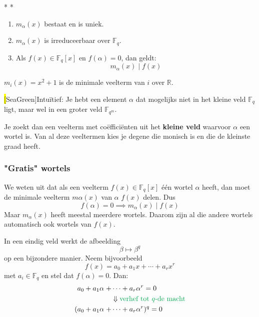 \begin{niceproperty}*\label{eigenshap:l9_min-veelterm}
    \nextpart[]*
    \begin{enumerate}
        \item $m_\alpha(x)$ bestaat en is uniek.
        \item $m_\alpha(x)$ is irreduceerbaar over $\mathbb{F}_q$.
        \item Als $f(x) \in \mathbb{F}_q\left[x\right]$ en $f(\alpha)=0$, dan geldt:
        \begin{equation*}
            m_\alpha(x) \mid f(x)
        \end{equation*}
    \end{enumerate}
\end{niceproperty}

 $m_i(x) = x^2 + 1$ is de minimale veelterm van $i$ over $\mathbb{R}$.

\begin{barbox}[SeaGreen][gray!5]
    \hl[SeaGreen]{Intuïtief:} Je hebt een element $\alpha$ dat mogelijks niet in het kleine veld $\mathbb{F}_q$ ligt, maar wel in een groter veld $\mathbb{F}_{q^m}$.
    
    \vspace{0.25cm}

    Je zoekt dan een veelterm met coëfficiënten uit het \textbf{kleine veld} waarvoor $\alpha$ een wortel is. Van al deze veeltermen kies je degene die monisch is en die de kleinste graad heeft.
\end{barbox}

\subsubsection{"Gratis" wortels}

We weten uit  dat als een veelterm $f(x) \in \mathbb{F}_q\left[x\right]$ één wortel $\alpha$ heeft, dan moet de minimale veelterm $m\alpha(x)$ van $\alpha$ $f(x)$ delen. Dus
\begin{equation*}
    f(\alpha) = 0 \implies m_\alpha(x) \mid f(x)
\end{equation*}
Maar $m_\alpha(x)$ heeft meestal meerdere wortels. Daarom zijn al die andere wortels automatisch ook wortels van $f(x)$.

In een eindig veld werkt de afbeelding
\begin{equation*}
    \beta \longmapsto \beta^q
\end{equation*}
op een bijzondere manier. Neem bijvoorbeeld
\begin{equation*}
    f(x) = a_0 + a_1x + \cdots + a_rx^r
\end{equation*}
met $a_i \in \mathbb{F}_q$ en stel dat $f(\alpha)=0$. Dan:
\begin{equation*}
    \begin{aligned}
        a_0 + a_1\alpha \;+ &\cdots + a_r\alpha^r = 0 \\
        &\Downarrow \textcolor{Green}{\text{verhef tot } q\text{-de macht}} \\
        (a_0 + a_1\alpha \;+ &\cdots + a_r\alpha^r)^q = 0 
    \end{aligned}
\end{equation*}

